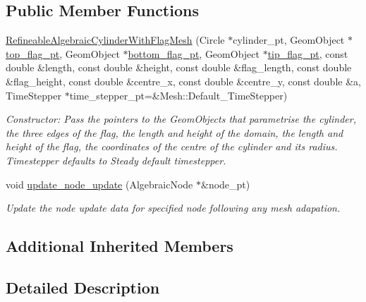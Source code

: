 \subsection*{Public Member Functions}
\begin{DoxyCompactItemize}
\item 
\hyperlink{classoomph_1_1RefineableAlgebraicCylinderWithFlagMesh_a9ddd203e89075036bfdfe6b695fb3395}{Refineable\+Algebraic\+Cylinder\+With\+Flag\+Mesh} (Circle $\ast$cylinder\+\_\+pt, Geom\+Object $\ast$\hyperlink{classoomph_1_1AlgebraicCylinderWithFlagMesh_a06bc13adad4aaa037d989bba9e3bf79d}{top\+\_\+flag\+\_\+pt}, Geom\+Object $\ast$\hyperlink{classoomph_1_1AlgebraicCylinderWithFlagMesh_a9c362fcc5edeb1b6e773f27a83778495}{bottom\+\_\+flag\+\_\+pt}, Geom\+Object $\ast$\hyperlink{classoomph_1_1AlgebraicCylinderWithFlagMesh_ad6d22aaa02d79e3c740b06d98a1597ea}{tip\+\_\+flag\+\_\+pt}, const double \&length, const double \&height, const double \&flag\+\_\+length, const double \&flag\+\_\+height, const double \&centre\+\_\+x, const double \&centre\+\_\+y, const double \&a, Time\+Stepper $\ast$time\+\_\+stepper\+\_\+pt=\&Mesh\+::\+Default\+\_\+\+Time\+Stepper)
\begin{DoxyCompactList}\small\item\em Constructor\+: Pass the pointers to the Geom\+Objects that parametrise the cylinder, the three edges of the flag, the length and height of the domain, the length and height of the flag, the coordinates of the centre of the cylinder and its radius. Timestepper defaults to Steady default timestepper. \end{DoxyCompactList}\item 
void \hyperlink{classoomph_1_1RefineableAlgebraicCylinderWithFlagMesh_a186963cf4b1fc118929e49e012eba4d2}{update\+\_\+node\+\_\+update} (Algebraic\+Node $\ast$\&node\+\_\+pt)
\begin{DoxyCompactList}\small\item\em Update the node update data for specified node following any mesh adapation. \end{DoxyCompactList}\end{DoxyCompactItemize}
\subsection*{Additional Inherited Members}


\subsection{Detailed Description}
